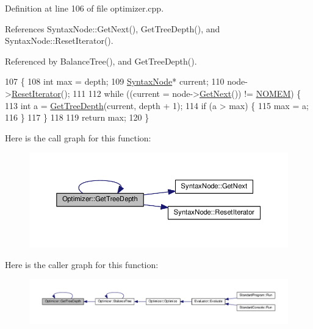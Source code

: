 Definition at line 106 of file optimizer.\+cpp.



References Syntax\+Node\+::\+Get\+Next(), Get\+Tree\+Depth(), and Syntax\+Node\+::\+Reset\+Iterator().



Referenced by Balance\+Tree(), and Get\+Tree\+Depth().


\begin{DoxyCode}
107 \{
108     \textcolor{keywordtype}{int} max = depth;
109     \hyperlink{classSyntaxNode}{SyntaxNode}* current;
110     node->\hyperlink{classSyntaxNode_ac51307368fb255aa760b99e137178c89}{ResetIterator}();
111 
112     \textcolor{keywordflow}{while} ((current = node->\hyperlink{classSyntaxNode_af1fa46ba30aa4f2affa2d4e96a4be010}{GetNext}()) != \hyperlink{platform_8h_a46ff2bfbf0d44b8466a2251d5bd5e6f8}{NOMEM}) \{
113         \textcolor{keywordtype}{int} a = \hyperlink{classOptimizer_a4a80c3e845604f1ea53a6bfc187b2bba}{GetTreeDepth}(current, depth + 1);
114         \textcolor{keywordflow}{if} (a > max) \{
115             max = a;
116         \}
117     \}
118 
119     \textcolor{keywordflow}{return} max;
120 \}
\end{DoxyCode}


Here is the call graph for this function\+:\nopagebreak
\begin{figure}[H]
\begin{center}
\leavevmode
\includegraphics[width=350pt]{classOptimizer_a4a80c3e845604f1ea53a6bfc187b2bba_cgraph}
\end{center}
\end{figure}




Here is the caller graph for this function\+:\nopagebreak
\begin{figure}[H]
\begin{center}
\leavevmode
\includegraphics[width=350pt]{classOptimizer_a4a80c3e845604f1ea53a6bfc187b2bba_icgraph}
\end{center}
\end{figure}


